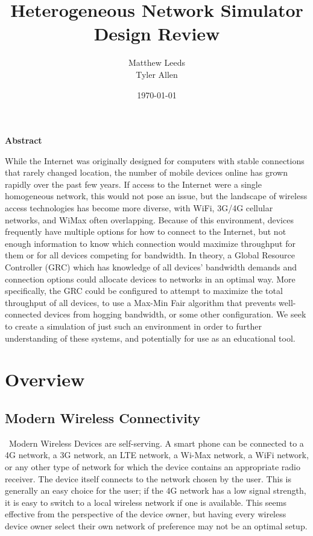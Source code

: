 \documentclass[11pt]{article}
\title{Heterogeneous Network Simulator Design Review}
\author{Matthew Leeds\\
	Tyler Allen\\}
\date{\today}
\begin{document}
\maketitle

{\setlength{\parindent}{0cm} \large \textbf{Abstract}}

While the Internet was originally designed for computers with stable connections that rarely changed location, the number of mobile devices online has grown rapidly over the past few years. If access to the Internet were a single homogeneous network, this would not pose an issue, but the landscape of wireless access technologies has become more diverse, with WiFi, 3G/4G cellular networks, and WiMax often overlapping. Because of this environment, devices frequently have multiple options for how to connect to the Internet, but not enough information to know which connection would maximize throughput for them or for all devices competing for bandwidth. In theory, a Global Resource Controller (GRC) which has knowledge of all devices' bandwidth demands and connection options could allocate devices to networks in an optimal way. More specifically, the GRC could be configured to attempt to maximize the total throughput of all devices, to use a Max-Min Fair algorithm that prevents well-connected devices from hogging bandwidth, or some other configuration. We seek to create a simulation of just such an environment in order to further understanding of these systems, and potentially for use as an educational tool.

\section{Overview}
\subsection{Modern Wireless Connectivity}
~\indent Modern Wireless Devices are self-serving. A smart phone can be connected to a
4G network, a 3G network, an LTE network, a Wi-Max network, a WiFi network, 
or any other type of network for which the device contains an appropriate 
radio receiver. The device itself connects to the network chosen by the user. 
This is generally an easy choice for the user; if the 4G network has a 
low signal strength, it is easy to switch to a local wireless network if one 
is available. This seems effective from the perspective of the device owner, 
but having every wireless device owner select their own network of preference 
may not be an optimal setup.
\end{document}

